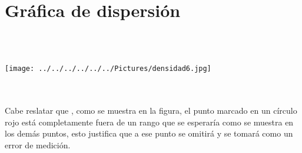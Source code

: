 \documentclass[10pt,a4paper]{article}
\begin{document}
\section*{Gr\'{a}fica de dispersi\'{o}n}
\\
\\
\begin{figure 5}
\centering
\texttt{[image: ../../../../../../Pictures/densidad6.jpg]} 
\\
\end{figure 5}
\\
\\
Cabe reslatar que , como se muestra en la figura, el punto marcado en un c\'{i}rculo rojo est\'{a} completamente fuera de un rango que se esperar\'{i}a como se muestra en los dem\'{a}s puntos, esto justifica que a ese punto se omitir\'{a} y se tomar\'{a} como un error de medici\'{o}n.  
\\
\end{document}
